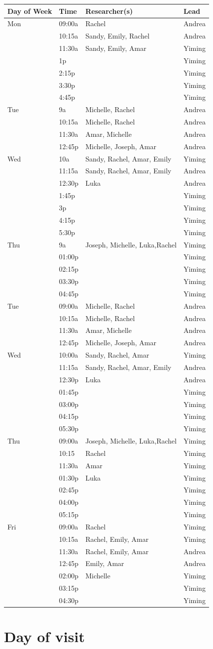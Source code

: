 \documentclass[]{article}
\begin{document}
\begin{longtable}[]{@{}llll@{}}
\toprule
Day of Week & Time & Researcher(s) & Lead\tabularnewline
\midrule
\endhead
Mon & 09:00a & Rachel & Andrea\tabularnewline
& 10:15a & Sandy, Emily, Rachel & Andrea\tabularnewline
& 11:30a & Sandy, Emily, Amar & Yiming\tabularnewline
& 1p & & Yiming\tabularnewline
& 2:15p & & Yiming\tabularnewline
& 3:30p & & Yiming\tabularnewline
& 4:45p & & Yiming\tabularnewline
Tue & 9a & Michelle, Rachel & Andrea\tabularnewline
& 10:15a & Michelle, Rachel & Andrea\tabularnewline
& 11:30a & Amar, Michelle & Andrea\tabularnewline
& 12:45p & Michelle, Joseph, Amar & Andrea\tabularnewline
Wed & 10a & Sandy, Rachel, Amar, Emily & Yiming\tabularnewline
& 11:15a & Sandy, Rachel, Amar, Emily & Andrea\tabularnewline
& 12:30p & Luka & Andrea\tabularnewline
& 1:45p & & Yiming\tabularnewline
& 3p & & Yiming\tabularnewline
& 4:15p & & Yiming\tabularnewline
& 5:30p & & Yiming\tabularnewline
Thu & 9a & Joseph, Michelle, Luka,Rachel & Yiming\tabularnewline
& 01:00p & & Yiming\tabularnewline
& 02:15p & & Yiming\tabularnewline
& 03:30p & & Yiming\tabularnewline
& 04:45p & & Yiming\tabularnewline
Tue & 09:00a & Michelle, Rachel & Andrea\tabularnewline
& 10:15a & Michelle, Rachel & Andrea\tabularnewline
& 11:30a & Amar, Michelle & Andrea\tabularnewline
& 12:45p & Michelle, Joseph, Amar & Andrea\tabularnewline
Wed & 10:00a & Sandy, Rachel, Amar & Yiming\tabularnewline
& 11:15a & Sandy, Rachel, Amar, Emily & Andrea\tabularnewline
& 12:30p & Luka & Andrea\tabularnewline
& 01:45p & & Yiming\tabularnewline
& 03:00p & & Yiming\tabularnewline
& 04:15p & & Yiming\tabularnewline
& 05:30p & & Yiming\tabularnewline
Thu & 09:00a & Joseph, Michelle, Luka,Rachel & Yiming\tabularnewline
& 10:15 & Rachel & Yiming\tabularnewline
& 11:30a & Amar & Yiming\tabularnewline
& 01:30p & Luka & Yiming\tabularnewline
& 02:45p & & Yiming\tabularnewline
& 04:00p & & Yiming\tabularnewline
& 05:15p & & Yiming\tabularnewline
Fri & 09:00a & Rachel & Yiming\tabularnewline
& 10:15a & Rachel, Emily, Amar & Yiming\tabularnewline
& 11:30a & Rachel, Emily, Amar & Andrea\tabularnewline
& 12:45p & Emily, Amar & Andrea\tabularnewline
& 02:00p & Michelle & Yiming\tabularnewline
& 03:15p & & Yiming\tabularnewline
& 04:30p & & Yiming\tabularnewline
\bottomrule
\end{longtable}

\hypertarget{day-of-visit}{%
\section{Day of visit}\label{day-of-visit}}
\end{document}

